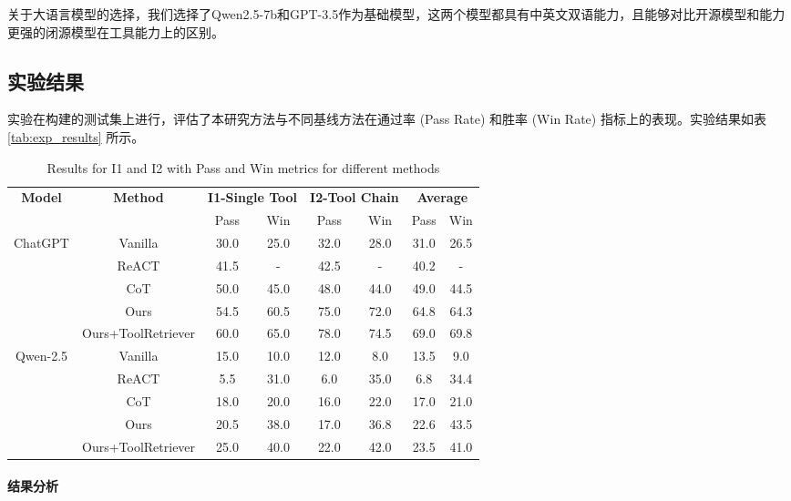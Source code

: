 关于大语言模型的选择，我们选择了Qwen2.5-7b和GPT-3.5作为基础模型，这两个模型都具有中英文双语能力，且能够对比开源模型和能力更强的闭源模型在工具能力上的区别。

\subsection{实验结果}
实验在构建的测试集上进行，评估了本研究方法与不同基线方法在通过率 (Pass Rate) 和胜率 (Win Rate) 指标上的表现。实验结果如表 \ref{tab:exp_results} 所示。


\begin{table}[!ht]
  \centering
  \begin{tabular}{c|c|cc|cc|cc}
  \toprule
  \textbf{Model} & \textbf{Method} & \multicolumn{2}{c|}{\textbf{I1-Single Tool}} & \multicolumn{2}{c|}{\textbf{I2-Tool Chain}} & \multicolumn{2}{c}{\textbf{Average}} \\
  & & Pass & Win & Pass & Win & Pass & Win \\
  \midrule
  ChatGPT & Vanilla          & 30.0 & 25.0 & 32.0 & 28.0 & 31.0 & 26.5 \\
          & ReACT            & 41.5 & -    & 42.5 & -    & 40.2 & -    \\
          & CoT              & 50.0 & 45.0 & 48.0 & 44.0 & 49.0 & 44.5 \\
          & Ours             & 54.5 & 60.5 & 75.0 & 72.0 & 64.8 & 64.3 \\
          & Ours+ToolRetriever & 60.0 & 65.0 & 78.0 & 74.5 & 69.0 & 69.8 \\
  \midrule
  Qwen-2.5 & Vanilla          & 15.0 & 10.0 & 12.0 & 8.0  & 13.5 & 9.0  \\
           & ReACT            & 5.5  & 31.0 & 6.0  & 35.0 & 6.8  & 34.4 \\
           & CoT              & 18.0 & 20.0 & 16.0 & 22.0 & 17.0 & 21.0 \\
           & Ours             & 20.5 & 38.0 & 17.0 & 36.8 & 22.6 & 43.5 \\
           & Ours+ToolRetriever & 25.0 & 40.0 & 22.0 & 42.0 & 23.5 & 41.0 \\
  \bottomrule
  \end{tabular}
  \caption{Results for I1 and I2 with Pass and Win metrics for different methods}
  \label{tab:simplified_pass_win}
\end{table}

\paragraph{结果分析}


